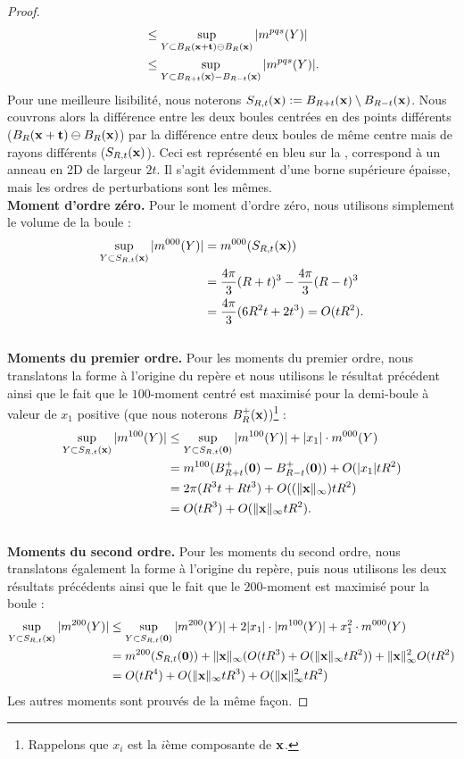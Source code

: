 \begin{proof}
\begin{align}
  &\le \sup_{Y \subset B_{R}(\mathbf{x}+\mathbf{t}) \ominus B_{R}(\mathbf{x})} |m^{pqs}(Y)|\\
  &\le \sup_{Y \subset B_{R+t}(\mathbf{x}) - B_{R-t}(\mathbf{x})} |m^{pqs}(Y)|.
\end{align}
%
Pour une meilleure lisibilité, nous noterons $S_{R,t}(\mathbf{x}) :=
B_{R+t}(\mathbf{x}) \setminus B_{R-t}(\mathbf{x})$. Nous couvrons alors la différence
entre les deux boules centrées en des points différents ($B_{R}(\mathbf{x}+\mathbf{t})
\ominus B_{R}(\mathbf{x})$) par la différence entre deux boules de même centre mais
de rayons différents ($S_{R,t}(\mathbf{x})$). Ceci est représenté
en bleu sur la , correspond à un anneau en 2D de
largeur $2t$. Il s'agit évidemment d'une borne supérieure épaisse, mais les
ordres de perturbations sont les mêmes.
%
\textbf{\\Moment d'ordre zéro.\quad}
%
Pour le moment d'ordre zéro, nous utilisons simplement le volume de la boule :
%
\begin{align}
  \sup_{Y \subset S_{R,t}(\mathbf{x})} |m^{000}(Y)|
  &= m^{000}( S_{R,t}(\mathbf{x}) ) \\
  &= \frac{4\pi}{3}(R+t)^3 - \frac{4\pi}{3}(R-t)^3 \\
  &= \frac{4\pi}{3}(6R^2t+2t^3)=O(tR^2).
\end{align}
%
\textbf{\\Moments du premier ordre.\quad}
%
Pour les moments du premier ordre, nous translatons la forme à l'origine du
repère et nous utilisons le résultat précédent ainsi que le fait que le
$100$-moment centré est maximisé pour la demi-boule à valeur de $x_1$ positive
(que nous noterons $B^+_{R}(\mathbf{x})$)\footnote{Rappelons que $x_i$ est la
$i$ème composante de $\mathbf{x}$.} :
%
\begin{align}
  \sup_{Y \subset S_{R,t}(\mathbf{x})} |m^{100}(Y)|
  &\le \sup_{Y \subset S_{R,t}(\mathbf{0})} |m^{100}(Y)| + |x_1|\cdot m^{000}(Y)\nonumber \\
  &= m^{100}( B^+_{R+t}(\mathbf{0}) - B^+_{R-t}(\mathbf{0}) ) + O(|x_1|tR^2) \nonumber \\
  &= 2\pi(R^3t +Rt^3) + O( (\| \mathbf{x} \|_\infty) tR^2) \nonumber \\
  &= O(tR^3) + O(\| \mathbf{x} \|_\infty tR^2).
\end{align}
%
\textbf{\\Moments du second ordre.\quad}
%
Pour les moments du second ordre, nous translatons également la forme à
l'origine du repère, puis nous utilisons les deux résultats précédents ainsi que
le fait que le $200$-moment est maximisé pour la boule :
%
\begin{align}
  \sup_{Y \subset S_{R,t}(\mathbf{x})} |m^{200}(Y)| &
  \le \sup_{Y \subset S_{R,t}(\mathbf{0})} |m^{200}(Y)| + 2|x_1|\cdot |m^{100}(Y)| + x_1^2\cdot m^{000}(Y) \nonumber \\
  & = m^{200}(S_{R,t}(\mathbf{0})) + \|\mathbf{x}\|_\infty (O(tR^3) + O(\|\mathbf{x}\|_\infty tR^2))+  \|\mathbf{x}\|_\infty^2 O(tR^2) \nonumber \\
  & = O(tR^4) +O(\|\mathbf{x}\|_\infty tR^3) +O(\|\mathbf{x}\|_\infty^2 tR^2)
\end{align}
%
Les autres moments sont prouvés de la même façon.
%
\end{proof}
%

